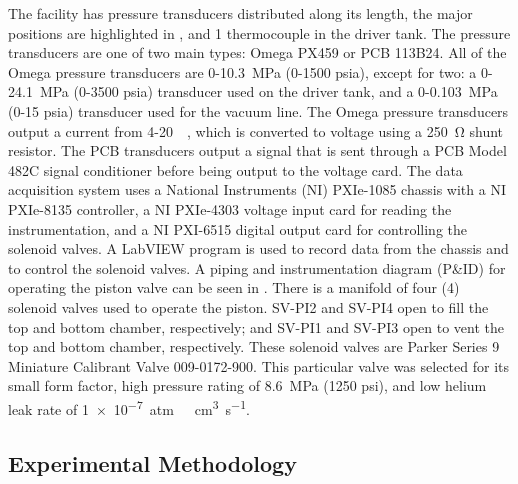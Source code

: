 The facility has pressure transducers distributed along its length, the major positions are highlighted in , and 1 thermocouple in the driver tank.
The pressure transducers are one of two main types: Omega PX459 or PCB 113B24.
All of the Omega pressure transducers are 0-\SI{10.3}{\mega\pascal} (0-1500 psia), except for two: a 0-\SI{24.1}{\mega\pascal} (0-3500 psia) transducer used on the driver tank, and a 0-\SI{0.103}{\mega\pascal} (0-15 psia) transducer used for the vacuum line.
The Omega pressure transducers output a current from 4-\SI{20}{\milli\amp}, which is converted to voltage using a \SI{250}{\ohm} shunt resistor.
The PCB transducers output a signal that is sent through a PCB Model 482C signal conditioner before being output to the voltage card.
The data acquisition system uses a National Instruments (NI) PXIe-1085 chassis with a NI PXIe-8135 controller, a NI PXIe-4303 voltage input card for reading the instrumentation, and a NI PXI-6515 digital output card for controlling the solenoid valves.
A LabVIEW program is used to record data from the chassis and to control the solenoid valves.
A piping and instrumentation diagram (P\&ID) for operating the piston valve can be seen in .
There is a manifold of four (4) solenoid valves used to operate the piston. SV-PI2 and SV-PI4 open to fill the top and bottom chamber, respectively; and SV-PI1 and SV-PI3 open to vent the top and bottom chamber, respectively.
These solenoid valves are Parker Series 9 Miniature Calibrant Valve 009-0172-900.
This particular valve was selected for its small form factor, high pressure rating of \SI{8.6}{\mega\pascal} (1250 psi), and low helium leak rate of \SI{1e-7}{atm\ \centi\meter^3\per\second}.








\subsection{Experimental Methodology} \label{ss:methodology}

